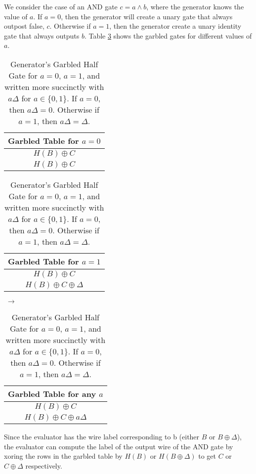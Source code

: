 We consider the case of an AND gate $c = a \wedge b$, where the generator knows the value of $a$. 
If $a = 0$, then the generator will create a unary gate that always outpost false, $c$. 
Otherwise if $a = 1$, then the generator create a unary identity gate that always outputs $b$. 
Table \ref{tbl:halfgate-gg-garb} shows the garbled gates for different values of $a$. 

\begin{table}[h]
    \label{tbl:halfgate-gg-garb}
    \centering
    \begin{tabular}{|c|}
        \hline
        Garbled Table for $a = 0$ \\
        \hline
        $H(B) \oplus C$ \\
        $H(B) \oplus C$ \\
        \hline
    \end{tabular}
    \begin{tabular}{|c|}
        \hline
        Garbled Table for $a = 1$ \\
        \hline
        $H(B) \oplus C$ \\
        $H(B) \oplus C \oplus \Delta$ \\
        \hline
    \end{tabular} $\;\rightarrow$
    \begin{tabular}{|c|}
        \hline
        Garbled Table for any $a$ \\
        \hline
        $H(B) \oplus C$ \\
        $H(B) \oplus C \oplus a\Delta$ \\
        \hline
    \end{tabular}
    \caption{Generator's Garbled Half Gate for $a = 0$, $a = 1$, and written more succinctly with $a\Delta$ for $a \in \{0,1\}$. If $a = 0$, then $a\Delta = 0$.  Otherwise if $a = 1$, then $a\Delta = \Delta$.}
\end{table}

Since the evaluator has the wire label corresponding to b (either $B$ or $B \oplus \Delta$), the evaluator can compute the label of the output wire of the AND gate by xoring the rows in the garbled table by $H(B)$ or $H(B \oplus \Delta)$ to get $C$ or $C \oplus \Delta$ respectively. 


